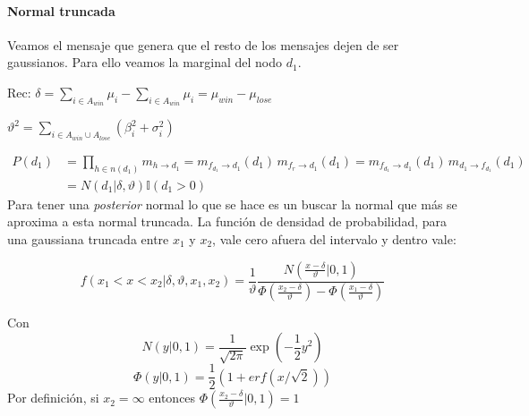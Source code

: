 \documentclass[11pt,twoside,spanish]{report} %
\begin{document}
\paragraph{Normal truncada}\label{appendix:truncada}
Veamos el mensaje que genera que el resto de los mensajes dejen de ser gaussianos. Para ello veamos la marginal del nodo $d_1$.

Rec: $\delta = \sum_{i\in A_{win}}\mu_i-\sum_{i\in A_{win}}\mu_i= \mu_{win}-\mu_{lose}$

$\vartheta^2 = \sum_{i\in A_{win}\cup A_{lose}}(\beta_i^2+\sigma_i^2)	$

\begin{equation}\label{eq:p_d}
	\begin{split}
		P(d_1) & =  \prod_{h \in n(d_1)} m_{h \rightarrow d_1} = m_{f_{d_1} \rightarrow d_1}(d_1) \, m_{f_r \rightarrow d_1}(d_1) = m_{f_{d_1} \rightarrow d_1}(d_1) \, m_{d_1 \rightarrow f_{d_1}}(d_1)  \\
		& = N(d_1|\delta,\vartheta) \mathbb{I}(d_1 > 0)
	\end{split}
\end{equation}
Para tener una \textit{posterior} normal lo que se hace es un buscar la normal que m\'as se aproxima a esta normal truncada.
La funci\'on de densidad de probabilidad, para una gaussiana truncada entre $x_1$ y $x_2$, vale cero afuera del intervalo  y dentro vale:

\begin{equation}
	f(x_1<x<x_2|\delta,\vartheta,x_1,x_2) = \frac{1}{\vartheta}\frac{N\left(\frac{x-\delta}{\vartheta}|0,1\right)}{\Phi\left(\frac{x_2-\delta}{\vartheta}\right)-\Phi\left(\frac{x_1-\delta}{\vartheta}\right)}
\end{equation}

Con
\begin{equation}
	N(y|0,1) = \frac{1}{\sqrt{2\pi}}\exp\left(-\frac{1}{2}y^2\right)
\end{equation}
\begin{equation}
	\Phi(y|0,1) = \frac{1}{2}(1+erf(x/\sqrt{2}))
\end{equation}
Por definici\'on, si $x_2=\infty$ entonces $\Phi\left(\frac{x_2-\delta}{\vartheta}|0,1\right)=1$
\end{document}
